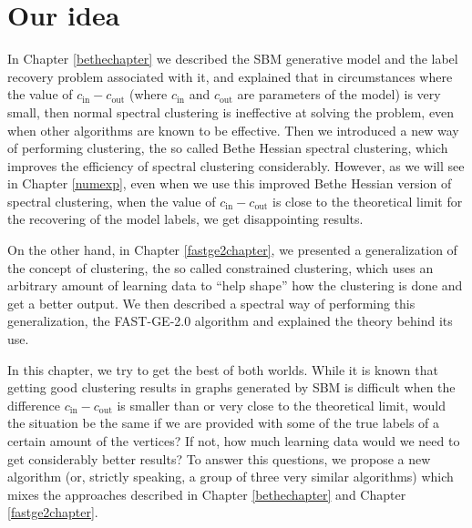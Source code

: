 \section{Our idea}
In Chapter \ref{bethechapter} we described the SBM generative model and the label recovery problem associated with it, and explained that in circumstances where the value of $c_\text{in} - c_\text{out}$ (where $c_\text{in}$ and $c_\text{out}$ are parameters of the model) is very small, then normal spectral clustering is ineffective at solving the problem, even when other algorithms are known to be effective.
Then we introduced a new way of performing clustering, the so called Bethe Hessian spectral clustering, which improves the efficiency of spectral clustering considerably. 
However, as we will see in Chapter \ref{numexp}, even when we use this improved Bethe Hessian version of spectral clustering, when the value of $c_\text{in} - c_\text{out}$ is close to the theoretical limit for the recovering of the model labels, we get disappointing results.

On the other hand, in Chapter \ref{fastge2chapter}, we presented a generalization of the concept of clustering, the so called constrained clustering, which uses an arbitrary amount of learning data to ``help shape'' how the clustering is done and get a better output.
We then described a spectral way of performing this generalization, the FAST-GE-2.0 algorithm and explained the theory behind its use.

In this chapter, we try to get the best of both worlds. 
While it is known that getting good clustering results in graphs generated by SBM is difficult when the difference $c_\text{in} - c_\text{out}$ is smaller than or very close to the theoretical limit, would the situation be the same if we are provided with some of the true labels of a certain amount of the vertices? If not, how much learning data would we need to get considerably better results?
To answer this questions, we propose a new algorithm (or, strictly speaking, a group of three very similar algorithms) which mixes the approaches described in Chapter \ref{bethechapter} and Chapter \ref{fastge2chapter}.

